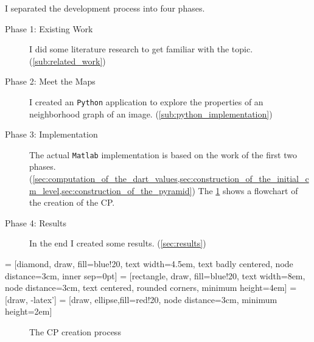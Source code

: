 \documentclass[12pt]{article}
\begin{document}
I separated the development process into four phases.

\begin{description}
  \item[Phase 1: Existing Work] I did some literature research to get familiar with the topic. (\cref{sub:related_work})
  \item[Phase 2: Meet the Maps] I created an \texttt{Python} application to explore the properties of an neighborhood graph of an image. (\cref{sub:python_implementation})
  \item[Phase 3: Implementation] The actual \texttt{Matlab} implementation is based on the work of the first two phases. (\cref{sec:computation_of_the_dart_values,sec:construction_of_the_initial_cm_level,sec:construction_of_the_pyramid})
  The \cref{fig:cp_creation_process} shows a flowchart of the creation of the CP\@.
  \item[Phase 4: Results] In the end I created some results. (\cref{sec:results})
\end{description}


 = [diamond, draw, fill=blue!20,
    text width=4.5em, text badly centered, node distance=3cm, inner sep=0pt]
 = [rectangle, draw, fill=blue!20,
    text width=8em, node distance=3cm, text centered, rounded corners, minimum height=4em]
 = [draw, -latex']
 = [draw, ellipse,fill=red!20, node distance=3cm,
    minimum height=2em]
\begin{figure}[tb]
  \centering
  \caption{The CP creation process}
  \label{fig:cp_creation_process}
\end{figure}
\end{document}
